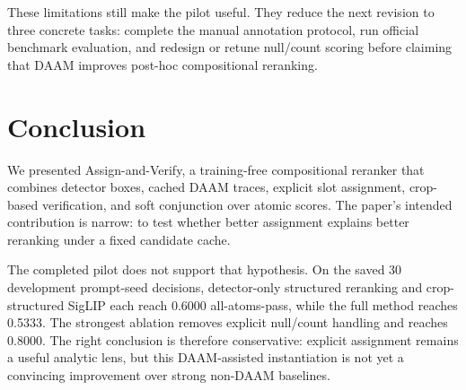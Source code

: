 \documentclass{article}
\newcommand{\method}{Assign-and-Verify\xspace}
\newcommand{\daam}{DAAM\xspace}
\begin{document}
These limitations still make the pilot useful. They reduce the next revision to three concrete tasks: complete the manual annotation protocol, run official benchmark evaluation, and redesign or retune null/count scoring before claiming that \daam improves post-hoc compositional reranking.

\section{Conclusion}
\label{sec:conclusion}

We presented \method, a training-free compositional reranker that combines detector boxes, cached \daam traces, explicit slot assignment, crop-based verification, and soft conjunction over atomic scores. The paper's intended contribution is narrow: to test whether better assignment explains better reranking under a fixed candidate cache.

The completed pilot does not support that hypothesis. On the saved 30 development prompt-seed decisions, detector-only structured reranking and crop-structured SigLIP each reach 0.6000 all-atoms-pass, while the full method reaches 0.5333. The strongest ablation removes explicit null/count handling and reaches 0.8000. The right conclusion is therefore conservative: explicit assignment remains a useful analytic lens, but this \daam-assisted instantiation is not yet a convincing improvement over strong non-\daam baselines.



\end{document}
